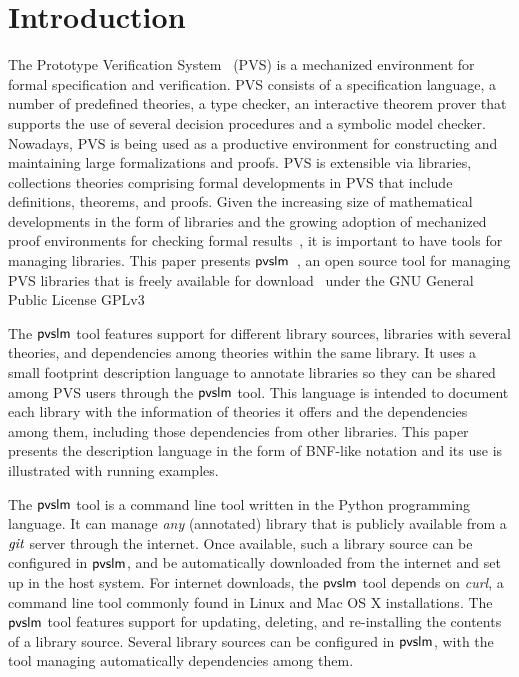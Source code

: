 \section{Introduction}
\label{sec.intro}

The Prototype Verification System~\cite{pvs-cade92} (PVS) is a
mechanized environment for formal specification and verification.  PVS
consists of a specification language, a number of predefined theories,
a type checker, an interactive theorem prover that supports the use of
several decision procedures and a symbolic model checker.  Nowadays,
PVS is being used as a productive environment for constructing and
maintaining large formalizations and proofs. PVS is extensible via
libraries, collections theories comprising formal developments in PVS
that include definitions, theorems, and proofs. Given the increasing
size of mathematical developments in the form of libraries and the
growing adoption of mechanized proof environments for checking formal
results~\cite{}, it is important to have tools for managing
libraries. This paper presents $\textsf{pvslm}$~\cite{pvslm}, an open source
tool for managing PVS libraries that is freely available for
download~\cite{pvslm} under the GNU General Public License GPLv3

The $\textsf{pvslm}$ tool features support for different library sources,
libraries with several theories, and dependencies among theories
within the same library. It uses a small footprint description
language to annotate libraries so they can be shared among PVS users
through the $\textsf{pvslm}$ tool. This language is intended to document each
library with the information of theories it offers and the
dependencies among them, including those dependencies from other
libraries. This paper presents the description language in the form of
BNF-like notation and its use is illustrated with running examples.

The $\textsf{pvslm}$ tool is a command line tool written in the Python
programming language. It can manage {\em any} (annotated) library that
is publicly available from a $\textit{git}$ server through the internet.
Once available, such a library source can be configured in $\textsf{pvslm}$,
and be automatically downloaded from the internet and set up in the
host system. For internet downloads, the $\textsf{pvslm}$ tool depends on {\em
  curl}, a command line tool commonly found in Linux and Mac OS X
installations. The $\textsf{pvslm}$ tool features support for updating,
deleting, and re-installing the contents of a library source.  Several
library sources can be configured in $\textsf{pvslm}$, with the tool managing
automatically dependencies among them.

